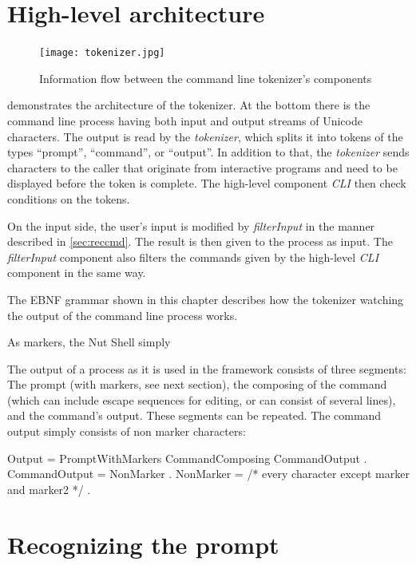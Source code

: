 \documentclass[paper=a4,twoside,abstract=on,cleardoublepage=empty,numbers=noenddot,toc=bib,12pt,appendixprefix=true]{scrreprt}
\begin{document}
\section{High-level architecture}

\begin{figure}[tb]
    \texttt{[image: tokenizer.jpg]}
    \centering
    \caption{Information flow between the command line tokenizer's components}
    \label{fig:tokenizer}
\end{figure}

  demonstrates the architecture of the tokenizer. At the bottom there is the command line process having both input and output streams of Unicode characters. The output is read by the \emph{tokenizer}, which splits it into tokens of the types “prompt”, “command”, or “output”. In addition to that, the \emph{tokenizer} sends characters to the caller that originate from interactive programs and need to be displayed before the token is complete. The high-level component \emph{CLI} then check conditions on the tokens.

On the input side, the user's input is modified by \emph{filterInput} in the manner described in \cref{sec:reccmd}. The result is then given to the process as input. The \emph{filterInput} component also filters the commands given by the high-level \emph{CLI} component in the same way.

The EBNF grammar shown in this chapter describes how the tokenizer watching the output of the command line process works.

As markers, the Nut Shell simply

The output of a process as it is used in the framework consists of three segments: The prompt (with markers, see next section), the composing of the command (which can include escape sequences for editing, or can consist of several lines), and the command's output. These segments can be repeated. The command output simply consists of non marker characters:

\begin{ebnf}
Output = { PromptWithMarkers CommandComposing CommandOutput } .
CommandOutput = { NonMarker } .
NonMarker = /* every character except marker and marker2 */ .
\end{ebnf}

\section{Recognizing the prompt}
\end{document}

